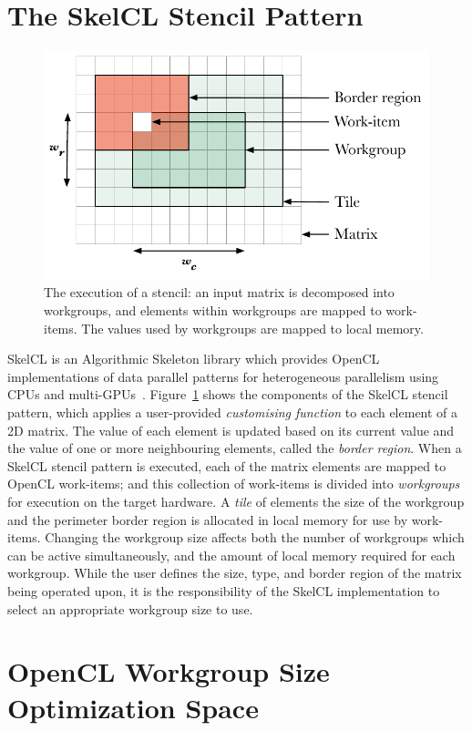 \documentclass[hidelinks]{acaces}
\begin{document}
\section{The SkelCL Stencil Pattern}

\begin{figure}
\includegraphics[width=.38\textwidth]{stencil}
\caption[Stencil border region]{%
  The execution of a stencil: an input matrix is decomposed into
  workgroups, and elements within workgroups are mapped to work-items.
  The values used by workgroups are mapped to local memory.%
  \vspace{-.75em} }
\label{fig:stencil-shape}
\end{figure}

SkelCL is an Algorithmic Skeleton library which provides OpenCL
implementations of data parallel patterns for heterogeneous
parallelism using CPUs and
multi-GPUs~\cite{Steuwer2011}. Figure~\ref{fig:stencil-shape} shows
the components of the SkelCL stencil pattern, which applies a
user-provided \emph{customising function} to each element of a 2D
matrix. The value of each element is updated based on its current
value and the value of one or more neighbouring elements, called the
\emph{border region}. When a SkelCL stencil pattern is executed, each
of the matrix elements are mapped to OpenCL work-items; and this
collection of work-items is divided into \emph{workgroups} for
execution on the target hardware. A \emph{tile} of elements the size
of the workgroup and the perimeter border region is allocated in local
memory for use by work-items. Changing the workgroup size affects both
the number of workgroups which can be active simultaneously, and the
amount of local memory required for each workgroup. While the user
defines the size, type, and border region of the matrix being operated
upon, it is the responsibility of the SkelCL implementation to select
an appropriate workgroup size to use.

\section{OpenCL Workgroup Size Optimization Space}
\end{document}
